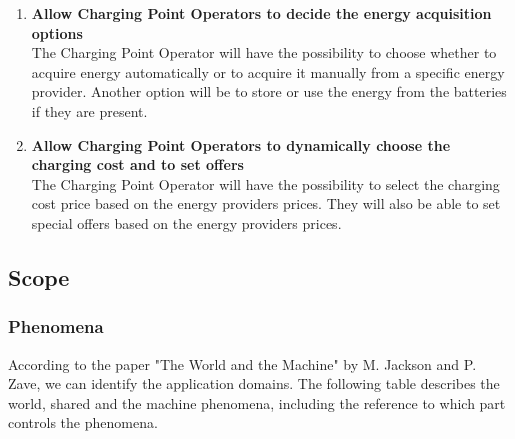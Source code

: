 \begin{enumerate}[label=$\bullet$ \textbf{G\arabic*:}]
        \item \textbf{Allow Charging Point Operators to decide the energy acquisition options}
        \\
        The Charging Point Operator will have the possibility to choose whether to acquire energy automatically or to acquire it manually from a specific energy provider.
        Another option will be to store or use the energy from the batteries if they are present.
        \item \textbf{Allow Charging Point Operators to dynamically choose the charging cost and to set offers}
        \\
        The Charging Point Operator will have the possibility to select the charging cost price based on the energy providers prices. They will also be able to set special offers based on the energy providers prices.
\end{enumerate}

\subsection{Scope}
\subsubsection{Phenomena}
According to the paper "The World and the Machine" by M. Jackson and P. Zave, 
we can identify the application domains. 
The following table describes the world, shared and the machine phenomena, 
including the reference to which part controls the phenomena.

